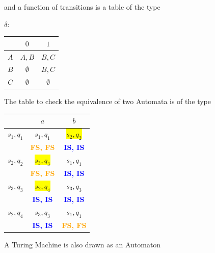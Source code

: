 \documentclass[a4 paper]{article}
\begin{document}
\noindent and a function of transitions is a table of the type

 \begin{center}
$\delta$: \begin{tabular}{c|c|c}
    & $0$ & $1$\\
\hline
    $A$ & $A,B$ & $B,C$ \\
    $B$ & $\emptyset$& $B,C$ \\
    $C$ &  $\emptyset$   & $\emptyset$ 
\end{tabular}
\end{center}

\begin{flushright}
\end{flushright}

\newpage
\vspace{5mm}

The table to check the equivalence of two Automata is of the type 

\begin{center}
\begin{tabular}{c|c|c}
    &$a$&$b$\\
\hline    
$s_1,q_1$  & $s_1,q_1$ & \colorbox{yellow}{$s_2,q_2$}\\
     & \textcolor{orange}{\textbf{FS, FS}}&\textcolor{blue}{\textbf{IS, IS}} \\
     \hline
$s_2,q_2$ &\colorbox{yellow}{$s_3,q_3$} &$s_1,q_1$\\
& \textcolor{orange}{\textbf{FS, FS}}  & \textcolor{blue}{\textbf{IS, IS}}\\
\hline
$s_3,q_3$ &\colorbox{yellow}{$s_2,q_4$} &$s_3,q_3$\\
& \textcolor{blue}{\textbf{IS, IS}}  & \textcolor{blue}{\textbf{IS, IS}}\\
\hline
$s_2,q_4$ &$s_3,q_3$ &$s_1,q_1$\\
& \textcolor{blue}{\textbf{IS, IS}} &\textcolor{orange}{\textbf{FS, FS}}\\
\end{tabular}
\end{center}

A Turing Machine is also drawn as an Automaton
\end{document}

